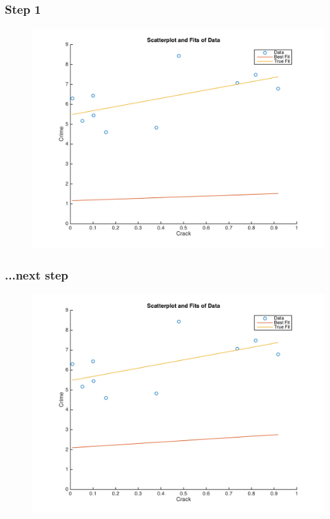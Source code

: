 \documentclass{beamer}
\begin{document}
\begin{frame}
\frametitle[alignment=center]{Step 1}
\begin{figure}
\centering
\includegraphics[scale=0.5]{Newton_OLS_Figure_2.png}
\end{figure}
\end{frame}

\begin{frame}
\frametitle[alignment=center]{...next step}
\begin{figure}
\centering
\includegraphics[scale=0.5]{Newton_OLS_Figure_3.png}
\end{figure}
\end{frame}
\end{document}
